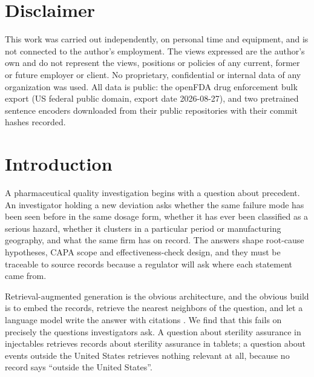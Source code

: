 \documentclass[acmsmall]{acmart}
\begin{document}



\maketitle


\section*{Disclaimer}
This work was carried out independently, on personal time and equipment, and is not connected to the author's employment. The views expressed are the author's own and do not represent the views, positions or policies of any current, former or future employer or client. No proprietary, confidential or internal data of any organization was used. All data is public: the openFDA drug enforcement bulk export (US federal public domain, export date 2026-08-27), and two pretrained sentence encoders downloaded from their public repositories with their commit hashes recorded.


\section{Introduction}
A pharmaceutical quality investigation begins with a question about precedent. An investigator holding a new deviation asks whether the same failure mode has been seen before in the same dosage form, whether it has ever been classified as a serious hazard, whether it clusters in a particular period or manufacturing geography, and what the same firm has on record. The answers shape root-cause hypotheses, CAPA scope and effectiveness-check design, and they must be traceable to source records because a regulator will ask where each statement came from.

Retrieval-augmented generation \cite{lewis2020rag} is the obvious architecture, and the obvious build is to embed the records, retrieve the nearest neighbors of the question, and let a language model write the answer with citations \cite{gao2023alce}. We find that this fails on precisely the questions investigators ask. A question about sterility assurance in injectables retrieves records about sterility assurance in tablets; a question about events outside the United States retrieves nothing relevant at all, because no record says ``outside the United States''.
\end{document}
